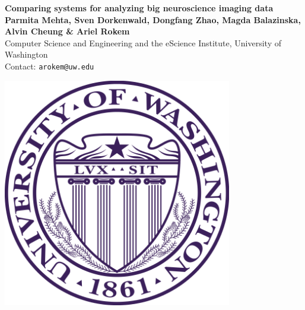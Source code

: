 \documentclass[a0,landscape]{a0poster}
\begin{document}


\begin{minipage}[b]{0.85\linewidth}
\veryHuge \color{NavyBlue} \textbf{Comparing systems for analyzing big neuroscience imaging data} \color{Black}\\ %
\huge \textbf{Parmita Mehta, Sven Dorkenwald, Dongfang Zhao, Magda Balazinska, Alvin Cheung \& Ariel Rokem}\\ %
\Large Computer Science and Engineering and the eScience Institute, University of Washington \\ %
\Large Contact: \texttt{arokem@uw.edu}
\end{minipage}
%
%
\begin{minipage}[b]{0.19\linewidth}
\includegraphics[width=10cm]{UWlogo.png}
\end{minipage}
\end{document}
